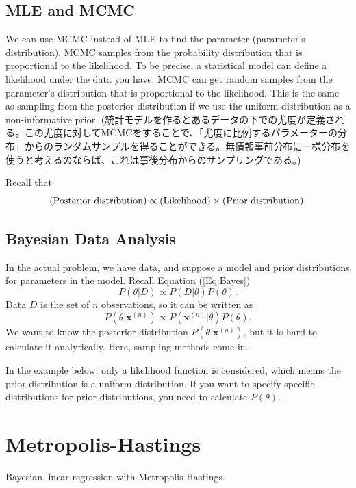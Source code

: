 \documentclass[a4paper,10.5pt,uplatex]{jsarticle}  %
\begin{document}
\subsection{MLE and MCMC}\label{Sec:MLEMCMC}
We can use MCMC instead of MLE to find the parameter (parameter's distribution). MCMC samples from the probability distribution that is proportional to the likelihood. To be precise, a statistical model can define a likelihood under the data you have. MCMC can get random samples from the parameter's distribution that is proportional to the likelihood. This is the same as sampling from the posterior distribution if we use the uniform distribution as a non-informative prior. (統計モデルを作るとあるデータの下での尤度が定義される。この尤度に対してMCMCをすることで、「尤度に比例するパラメーターの分布」からのランダムサンプルを得ることができる。無情報事前分布に一様分布を使うと考えるのならば、これは事後分布からのサンプリングである。)\par
Recall that $$({\rm Posterior\ distribution}) \propto ({\rm Likelihood}) \times ({\rm Prior\ distribution}).$$

\subsection{Bayesian Data Analysis}
In the actual problem, we have data, and suppose a model and prior distributions for parameters in the model. Recall Equation (\ref{Eq:Bayes}) \begin{equation*}P(\theta|D) \propto P(D|\theta) P(\theta).\end{equation*} Data $D$ is the set of $n$ observations, so it can be written as\begin{equation} P(\theta|\mathbf{x}^{(n)}) \propto P(\mathbf{x}^{(n)}|\theta) P(\theta).\label{Eq:BayesX}\end{equation} We want to know the posterior distribution $P(\theta|\mathbf{x}^{(n)})$, but it is hard to calculate it analytically. Here, sampling methods come in.\par
  In the example below, only a likelihood function is considered, which means the prior distribution is a uniform distribution. If you want to specify specific distributions for prior distributions, you need to calculate $P(\theta)$.

\section{Metropolis-Hastings}
Bayesian linear regression with Metropolis-Hastings.
\end{document}
